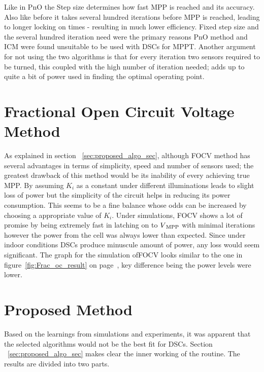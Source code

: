  Like in \ac{PnO} the Step size determines how fast \ac{MPP} is reached and its accuracy. Also like before it takes several hundred iterations before \ac{MPP} is reached, leading to longer locking on times - resulting in much lower efficiency. Fixed step size and the several hundred iteration need were the primary reasons \ac{PnO} method and \ac{ICM} were found unsuitable to be used with \ac{DSCs} for \ac{MPPT}. Another argument for not using the two algorithms is that for every iteration two sensors required to be turned, this coupled with the high number of iteration needed; adds up to quite a bit of power used in finding the optimal operating point.             
 
         
 \section{Fractional Open Circuit Voltage Method }
 
As explained in section ~\ref{sec:proposed_algo_sec}, although \ac{FOCV} method has several advantages in terms of simplicity, speed and number of sensors used; the greatest drawback of this method would be its inability of every achieving true \ac{MPP}. By assuming $K_{i}$ as a constant under different illuminations leads to slight loss of power but the simplicity of the circuit helps in reducing its power consumption. This seems to be a fine balance whose odds can be increased by choosing a appropriate value of $K_{i}$. Under simulations, \ac{FOCV} shows a lot of promise by being extremely fast in latching on to $V\textsubscript{MPP}$ with minimal iterations however the power from the cell was always lower than expected. Since under indoor conditions \ac{DSCs} produce minuscule amount of power, any loss would seem significant. The graph for the simulation of\ac{FOCV} looks similar to the one in figure~\ref{fig:Frac_oc_result} on page~\pageref{fig:Frac_oc_result}, key difference being the power levels were lower.             

\section{Proposed Method }

Based on the learnings from simulations and experiments, it was apparent that the selected algorithms would not be the best fit for \ac{DSCs}. Section ~\ref{sec:proposed_algo_sec} makes clear the inner working of the routine. The results are divided into two parts.\\
	
